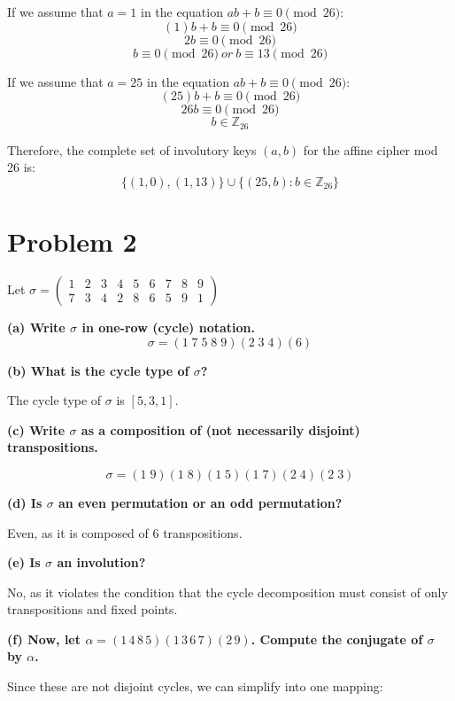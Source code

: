 \documentclass[12pt]{article}
\begin{document}
If we assume that $a = 1$ in the equation $ab + b \equiv 0 \pmod{26}$:
\[(1)b + b \equiv 0 \pmod{26}\]
\[2b \equiv 0 \pmod{26}\]
\[b \equiv 0 \pmod{26}\ or \ b \equiv 13 \pmod{26}\]

If we assume that $a = 25$ in the equation $ab + b \equiv 0 \pmod{26}$:
\[(25)b + b \equiv 0 \pmod{26}\]
\[26b \equiv 0 \pmod{26}\]
\[b \in \mathbb{Z}_{26}\]

Therefore, the complete set of involutory keys $(a,b)$ for the affine cipher mod 26 is:
\[\{(1,0), (1,13)\} \cup \{(25,b) : b \in \mathbb{Z}_{26}\}\]

\newpage
\section*{Problem 2}
Let $\sigma = \begin{pmatrix} 
1 & 2 & 3 & 4 & 5 & 6 & 7 & 8 & 9 \\ 
7 & 3 & 4 & 2 & 8 & 6 & 5 & 9 & 1 
\end{pmatrix}$

\textbf{(a) Write $\sigma$ in one-row (cycle) notation.}
\[\sigma = (1 \; 7 \; 5 \; 8 \; 9)(2 \; 3 \; 4)(6)\]

\vspace{1.5em}
\textbf{(b) What is the cycle type of $\sigma$?}

The cycle type of $\sigma$ is $[5,3,1]$.

\vspace{1.5em}
\textbf{(c) Write $\sigma$ as a composition of (not necessarily disjoint) transpositions.}

\[\sigma = (1 \; 9)(1 \; 8)(1 \; 5)(1 \; 7)(2 \; 4)(2 \; 3)\]

\vspace{1.5em}
\textbf{(d) Is $\sigma$ an even permutation or an odd permutation?}

Even, as it is composed of 6 transpositions.

\vspace{1.5em}
\textbf{(e) Is $\sigma$ an involution?}

No, as it violates the condition that the cycle decomposition must consist of only transpositions and fixed points.

\vspace{1.5em}
\textbf{(f) Now, let $\alpha = (1\,4\,8\,5)(1\,3\,6\,7)(2\,9)$. Compute the conjugate of $\sigma$ by $\alpha$.}

Since these are not disjoint cycles, we can simplify into one mapping:
\end{document}
